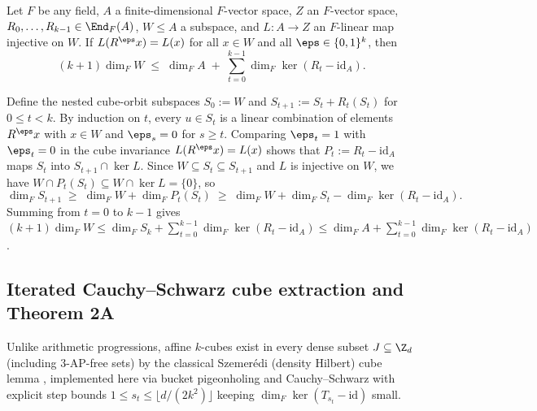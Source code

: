 \begin{lemma}\label{lem:affine-cube}
Let $F$ be any field, $A$ a finite-dimensional $F$-vector space, $Z$ an $F$-vector space,
$R_0, \dots, R_{k-1} \in \End_F(A)$, $W \le A$ a subspace, and $L : A \to Z$ an $F$-linear map
injective on $W$. If $L(R^\eps x) = L(x)$ for all $x \in W$ and all $\eps \in \{0,1\}^k$, then
\[
  (k + 1)\dim_F W \;\le\; \dim_F A \;+\; \sum_{t=0}^{k-1} \dim_F \ker(R_t - \mathrm{id}_A).
\]
\end{lemma}
\begin{outline}
Define the nested cube-orbit subspaces $S_0 := W$ and $S_{t+1} := S_t + R_t(S_t)$ for
$0 \le t < k$. By induction on $t$, every $u \in S_t$ is a linear combination of elements
$R^\eps x$ with $x \in W$ and $\eps_s = 0$ for $s \ge t$. Comparing $\eps_t = 1$ with
$\eps_t = 0$ in the cube invariance $L(R^\eps x) = L(x)$ shows that $P_t := R_t - \mathrm{id}_A$
maps $S_t$ into $S_{t+1} \cap \ker L$. Since $W \subseteq S_t \subseteq S_{t+1}$ and $L$ is
injective on $W$, we have $W \cap P_t(S_t) \subseteq W \cap \ker L = \{0\}$, so
\[
  \dim_F S_{t+1} \;\ge\; \dim_F W + \dim_F P_t(S_t)
  \;\ge\; \dim_F W + \dim_F S_t - \dim_F \ker(R_t - \mathrm{id}_A).
\]
Summing from $t = 0$ to $k - 1$ gives $(k+1)\dim_F W \le \dim_F S_k + \sum_{t=0}^{k-1}
\dim_F\ker(R_t - \mathrm{id}_A) \le \dim_F A + \sum_{t=0}^{k-1} \dim_F\ker(R_t - \mathrm{id}_A)$.
\end{outline}

\subsection{Iterated Cauchy--Schwarz cube extraction and Theorem 2A}\label{sec:thm2a}

Unlike arithmetic progressions, affine $k$-cubes exist in every dense subset $J \subseteq \Z_d$
(including $3$-AP-free sets) by the classical Szemer\'edi (density Hilbert) cube lemma
\cite{Szemeredi1969,GRS1990}, implemented here via bucket pigeonholing and Cauchy--Schwarz with
explicit step bounds $1 \le s_t \le \lfloor d / (2 k^2)\rfloor$ keeping
$\dim_F\ker(T_{s_t} - \mathrm{id})$ small.

